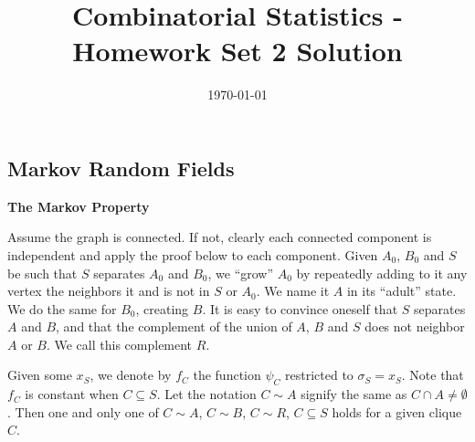 \documentclass[11pt]{article} \usepackage{amssymb}
\begin{document}
\title{Combinatorial Statistics - Homework Set 2 Solution}

\date{\today}
\maketitle
\subsection{Markov Random Fields}
{\bf The Markov Property}

Assume the graph is connected. If not, clearly each connected component is
independent and apply the proof below to each component.
Given $A_0$, $B_0$ and $S$ be such that $S$ separates $A_0$ and $B_0$,
we ``grow'' $A_0$ by repeatedly adding to it any vertex the neighbors it
and is not in $S$ or $A_0$. We name it $A$ in its ``adult'' state. We do
the same for $B_0$, creating $B$. It is easy to
convince oneself that $S$ separates $A$ and $B$, and that the complement of the 
union of $A$, $B$ and $S$ does not neighbor $A$ or $B$. We call this complement
$R$.

Given some $x_S$, we denote by $f_C$ the function $\psi_C$ restricted
to $\sigma_S=x_S$. Note that $f_C$ is constant when $C\subseteq S$. Let the notation $C\sim A$ 
signify the same as $C\cap A\neq\emptyset$. Then one and only one of $C\sim A$, $C\sim B$,
$C\sim R$, $C\subseteq S$  holds for a given clique $C$.
\end{document}
